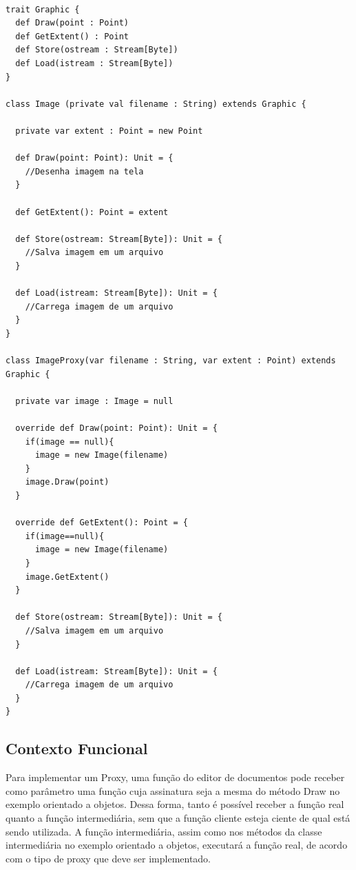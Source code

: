 \begin{lstlisting}[caption={Proxy Orientado a Objetos},label=ooproxy]

trait Graphic {
  def Draw(point : Point)
  def GetExtent() : Point
  def Store(ostream : Stream[Byte])
  def Load(istream : Stream[Byte])
}

class Image (private val filename : String) extends Graphic {

  private var extent : Point = new Point

  def Draw(point: Point): Unit = {
    //Desenha imagem na tela
  }

  def GetExtent(): Point = extent

  def Store(ostream: Stream[Byte]): Unit = {
    //Salva imagem em um arquivo
  }

  def Load(istream: Stream[Byte]): Unit = {
    //Carrega imagem de um arquivo
  }
}

class ImageProxy(var filename : String, var extent : Point) extends Graphic {

  private var image : Image = null

  override def Draw(point: Point): Unit = {
    if(image == null){
      image = new Image(filename)
    }
    image.Draw(point)
  }

  override def GetExtent(): Point = {
    if(image==null){
      image = new Image(filename)
    }
    image.GetExtent()
  }

  def Store(ostream: Stream[Byte]): Unit = {
    //Salva imagem em um arquivo
  }

  def Load(istream: Stream[Byte]): Unit = {
    //Carrega imagem de um arquivo
  }
}

\end{lstlisting}

\subsection*{Contexto Funcional}

Para implementar um Proxy, uma função do 
editor de documentos pode receber como 
parâmetro uma função cuja assinatura seja 
a mesma do método Draw no exemplo orientado 
a objetos. Dessa forma, tanto é possível 
receber a função real quanto a função 
intermediária, sem que a função cliente 
esteja ciente de qual está sendo utilizada. 
A função intermediária, assim como nos 
métodos da classe intermediária no exemplo 
orientado a objetos, executará a função 
real, de acordo com o tipo de proxy que 
deve ser implementado. 

